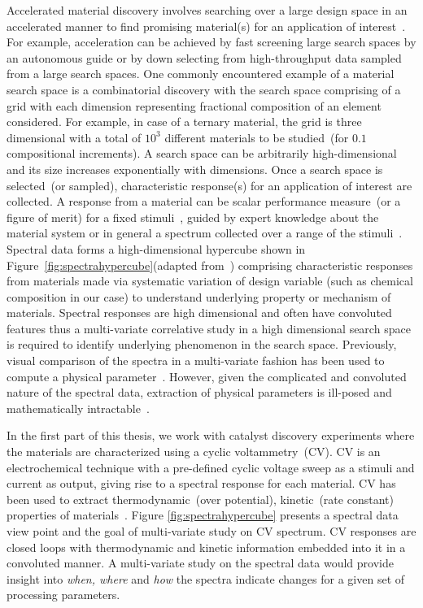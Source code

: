 Accelerated material discovery involves searching over a large design space in an accelerated manner to find promising material(s) for an application of interest~\cite{rajan2013informatics,ajayi2016rapid}.
For example, acceleration can be achieved by fast screening large search spaces by an autonomous guide or by down selecting from high-throughput data sampled from a large search spaces. 
One commonly encountered example of a material search space is a combinatorial discovery with the search space comprising of a grid with each dimension representing fractional composition of an element considered.
For example, in case of a ternary material, the grid is three dimensional with a total of \(10^3\) different materials to be studied~(for \(0.1\) compositional increments). 
A search space can be arbitrarily high-dimensional and its size increases exponentially with dimensions. 
Once a search space is selected~(or sampled), characteristic response(s) for an application of interest are collected. 
A response from a material can be scalar performance measure~(or a figure of merit) for a fixed stimuli~\cite{haber2014high,suram2015generating}, guided by expert knowledge about the material system or in general a spectrum collected over a range of the stimuli~\cite{hattrick2016perspective}. 
Spectral data forms a high-dimensional hypercube shown in Figure~\ref{fig:spectrahypercube}(adapted from~\cite{rajan2013informatics}) comprising characteristic responses from materials made via systematic variation of design variable (such as chemical composition in our case) to understand underlying property or mechanism of materials.
Spectral responses are high dimensional and often have convoluted features thus a multi-variate correlative study in a high dimensional search space is required to identify underlying phenomenon in the search space.
Previously, visual comparison of the spectra in a multi-variate fashion has been used to compute a physical parameter~\cite{de2008core,de19902p}. 
However, given the complicated and convoluted nature of the spectral data, extraction of physical parameters is ill-posed and mathematically intractable~\cite{suzuki2019automated}. 

In the first part of this thesis, we work with catalyst discovery experiments where the materials are characterized using a cyclic voltammetry~(CV). 
CV is an electrochemical technique with a pre-defined cyclic voltage sweep as a stimuli and current as output, giving rise to a spectral response for each material. 
CV has been used to extract thermodynamic~(over potential), kinetic~(rate constant) properties of materials~\cite{martin2016qualitative,rountree2014evaluation,haber2014high}. 
Figure \ref{fig:spectrahypercube} presents a spectral data view point and the goal of multi-variate study on CV spectrum. 
CV responses are closed loops with thermodynamic and kinetic information embedded into it in a convoluted manner. 
A multi-variate study on the spectral data would provide insight into \textit{when, where} and \textit{how} the spectra indicate changes for a given set of processing parameters.

